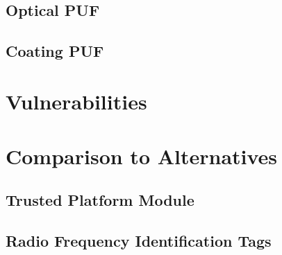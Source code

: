 ~\cite{butterflypuf}
\subsection{Optical PUF}

\subsection{Coating PUF}





\section{Vulnerabilities}


\section{Comparison to Alternatives}

\subsection{Trusted Platform Module}

\subsection{Radio Frequency Identification Tags}

